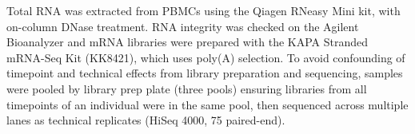 Total RNA was extracted from \glspl{PBMC} using the Qiagen RNeasy Mini kit, with on-column DNase treatment.
RNA integrity was checked on the Agilent Bioanalyzer and mRNA libraries were prepared with the KAPA Stranded mRNA-Seq Kit (KK8421), which uses poly(A) selection.
To avoid confounding of timepoint and technical effects from library preparation and sequencing,
samples were pooled by library prep plate (three pools) ensuring libraries from all timepoints of an individual were in the same pool, 
then sequenced across multiple lanes as technical replicates (HiSeq 4000, \SI{75}{\bp} paired-end).


